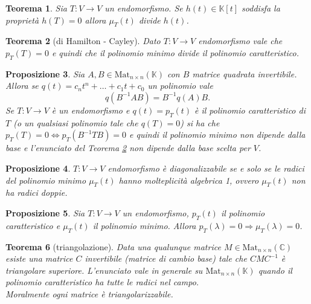 \documentclass[9pt, a4paper]{article}
\newcommand{\C}{\mathbb{C}}
\newcommand{\K}{\mathbb{K}}
\theoremstyle{mythm}
\newtheorem{thm}{Teorema}[section]
\newtheorem{prop}[thm]{Proposizione}
\begin{document}
\begin{thm}
	Sia $ T \colon V \to V $ un endomorfismo. Se $ h(t) \in \K[t] $ soddisfa la proprietà $ h(T) = 0 $ allora $ \mu_T(t) $ divide $ h(t) $. 
\end{thm}

\begin{thm}[di Hamilton - Cayley] \label{thm:HC}
	Dato $ T \colon V \to V $ endomorfismo vale che $ p_T(T) = 0 $ e quindi che il polinomio minimo divide il polinomio caratteristico. 
\end{thm}

\begin{prop}
	Sia $ A, B \in \mathrm{Mat}_{n \times n} (\K) $ con $ B $ matrice quadrata invertibile. Allora se $ q(t) = c_n t^{n} + \ldots + c_1 t + c_0 $ un polinomio vale \[q(B^{-1} A B) = B^{-1} q(A) B. \] Se $ T \colon V \to V $ è un endomorfismo  e $ q(t) = p_T(t) $ è il polinomio caratteristico di $ T $ (o un qualsiasi polinomio tale che $ q(T) = 0 $) si ha che $ p_T(T) = 0 \Leftrightarrow p_T(B^{-1} T B) = 0 $ e quindi il polinomio minimo non dipende dalla base e l'enunciato del Teorema \ref{thm:HC} non dipende dalla base scelta per $ V $. 
\end{prop}

\begin{prop}
	$ T \colon V \to V $ endomorfismo è diagonalizzabile se e solo se le radici del polinomio minimo $ \mu_T(t) $ hanno molteplicità algebrica 1, ovvero $ \mu_T(t) $ non ha radici doppie. 
\end{prop}

\begin{prop}
	Sia $ T \colon V \to V $ un endomorfismo, $ p_T(t) $ il polinomio caratteristico e $ \mu_T(t) $ il polinomio minimo. Allora $ p_T(\lambda) = 0 \Rightarrow \mu_T(\lambda) = 0 $. 
\end{prop}

\begin{thm}[triangolazione]
	Data una qualunque matrice $ M \in \mathrm{Mat}_{n \times n} (\C) $ esiste una matrice $ C $ invertibile (matrice di cambio base) tale che $ CMC^{-1} $ è triangolare superiore. L'enunciato vale in generale su $ \mathrm{Mat}_{n \times n} (\K) $ quando il polinomio caratteristico ha tutte le radici nel campo. \\ Moralmente ogni matrice è triangolarizzabile. 
\end{thm}

\vspace{2mm}
\end{document}
